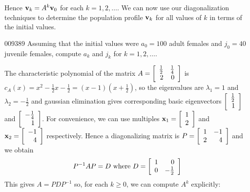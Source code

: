 \noindent Hence $\textbf{v}_{k} = A^{k}\textbf{v}_{0}$ for each $k = 1, 2, \dots$. We can now use our diagonalization techniques to determine the population profile $\textbf{v}_{k}$ for all values of $k$ in terms of the initial values.


\begin{example}{}{009389}
Assuming that the initial values were $a_{0} = 100$ adult females and $j_{0} = 40$ juvenile females, compute $a_{k}$ and $j_{k}$ for $k = 1, 2, \dots$.


\begin{solution}
  The characteristic polynomial of the matrix $A = \left[ \begin{array}{rr}
\tfrac{1}{2} & \tfrac{1}{4} \\
2 & 0 
\end{array}\right]$
 is $c_{A}(x) = x^{2} - \frac{1}{2}x - \frac{1}{2} = (x - 1)(x + \frac{1}{2})$, so the eigenvalues are $\lambda_{1} = 1$ and $\lambda_{2} = -\frac{1}{2}$ and gaussian elimination gives corresponding basic eigenvectors $\left[ \begin{array}{r}
\tfrac{1}{2} \\
1
\end{array}\right]$
 and $\left[ \begin{array}{r}
-\tfrac{1}{4} \\
1
\end{array}\right]$.
 For convenience, we can use multiples $\textbf{x}_1 = \left[ \begin{array}{r}
1 \\
2
\end{array}\right]$
 and $\textbf{x}_2 = \left[ \begin{array}{r}
-1 \\
4
\end{array}\right]$
 respectively. Hence a diagonalizing matrix is $P = \left[ \begin{array}{rr}
1 & -1 \\
2 & 4 
\end{array} \right]$
 and we obtain
\begin{equation*}
P^{-1}AP=D \mbox{ where } D = \left[ \begin{array}{rr}
1 & 0 \\
0 & -\tfrac{1}{2}
\end{array}\right]
\end{equation*}
This gives $A = PDP^{-1}$ so, for each $k \geq 0$, we can compute $A^{k}$ explicitly:



\end{solution}
\end{example}
